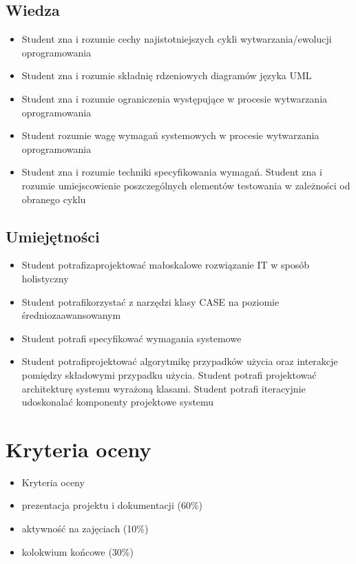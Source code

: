 \documentclass[12pt, a4paper]{article}
\begin{document}
\subsection*{Wiedza}
\begin{itemize}
  \item Student zna i rozumie cechy najistotniejszych cykli wytwarzania/ewolucji oprogramowania
  \item Student zna i rozumie składnię rdzeniowych diagramów języka UML
  \item Student zna i rozumie ograniczenia występujące w procesie wytwarzania oprogramowania
  \item Student rozumie wagę wymagań systemowych w procesie wytwarzania oprogramowania
  \item Student zna i rozumie techniki specyfikowania wymagań. Student zna i rozumie umiejscowienie poszczególnych elementów testowania w zależności od obranego cyklu
\end{itemize}

\subsection*{Umiejętności}
\begin{itemize}
  \item Student potrafizaprojektować małoskalowe rozwiązanie IT w sposób holistyczny
  \item Student potrafikorzystać z narzędzi klasy CASE na poziomie średniozaawansowanym
  \item Student potrafi specyfikować wymagania systemowe
  \item Student potrafiprojektować algorytmikę przypadków użycia oraz interakcje pomiędzy składowymi przypadku użycia. Student potrafi projektować architekturę systemu wyrażoną klasami. Student potrafi iteracyjnie udoskonalać komponenty projektowe systemu
\end{itemize}

\section{Kryteria oceny}

\begin{itemize}
  \item Kryteria oceny
  \item prezentacja projektu i dokumentacji (60\%)
  \item aktywność na zajęciach (10\%)
  \item kolokwium końcowe (30\%)
\end{itemize}
\end{document}
